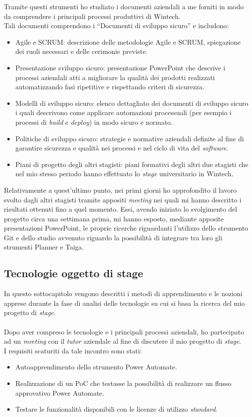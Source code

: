 Tramite questi strumenti ho studiato i documenti aziendali a me forniti in modo da comprendere i principali processi produttivi di Wintech.\\ 
Tali documenti comprendono i “Documenti di sviluppo sicuro” e includono:
\begin{itemize}
    \item Agile e SCRUM: descrizione delle metodologie Agile e SCRUM, spiegazione dei ruoli necessari e delle cerimonie previste. 
    \item Presentazione sviluppo sicuro: presentazione PowerPoint che descrive i processi aziendali atti a migliorare la qualità dei prodotti realizzati automatizzando fasi ripetitive e rispettando criteri di sicurezza. 
    \item Modelli di sviluppo sicuro: elenco dettagliato dei documenti di sviluppo sicuro i quali descrivono come applicare automazioni processuali (per esempio i processi di \emph{build} e \emph{deploy}) in modo sicuro e normato. 
    \item Politiche di sviluppo sicuro: strategie e normative aziendali definite al fine di garantire sicurezza e qualità nei processi e nel ciclo di vita del \emph{software}. 
    \item Piani di progetto degli altri stagisti: piani formativi degli altri due stagisti che nel mio stesso periodo hanno effettuato lo \emph{stage} universitario in Wintech. 
\end{itemize}
Relativamente a quest'ultimo punto, nei primi giorni ho approfondito il lavoro svolto dagli altri stagisti tramite appositi \emph{meeting} nei quali mi hanno descritto i risultati ottenuti fino a quel momento. Essi, avendo iniziato lo svolgimento del progetto circa una settimana prima, mi hanno esposto, mediante apposite presentazioni PowerPoint, le proprie ricerche riguardanti l'utilizzo dello strumento Git e dello studio avvenuto riguardo la possibilità di integrare tra loro gli strumenti Planner e Taiga. 

\subsection{Tecnologie oggetto di stage}
In questo sottocapitolo vengono descritti i metodi di apprendimento e le nozioni apprese durante la fase di analisi delle tecnologie su cui si basa la ricerca del mio progetto di \emph{stage}.\\\\
Dopo aver compreso le tecnologie e i principali processi aziendali, ho partecipato ad un \emph{meeting} con il \emph{tutor} aziendale al fine di discutere il mio progetto di \emph{stage}.\\
I requisiti scaturiti da tale incontro sono stati: 
\begin{itemize}
    \item Autoapprendimento dello strumento Power Automate.
    \item Realizzazione di un PoC che testasse la possibilità di realizzare un flusso approvativo Power Automate. 
    \item Testare le funzionalità disponibili con le licenze di utilizzo \emph{standard}. 
\end{itemize}

